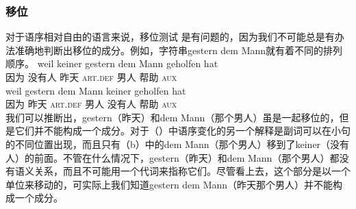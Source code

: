 \subsubsection{移位}
对于语序相对自由的语言来说，移位测试 是有问题的，因为我们不可能总是有办法准确地判断出移位的成分。例如，字符串gestern dem Mann就有着不同的排列顺序。
\eal
\ex 
\gll weil keiner gestern dem Mann geholfen hat\\
     因为 没有人 昨天 \textsc{art}.\textsc{def} 男人 帮助 \textsc{aux}\\
\ex 
\gll weil gestern dem Mann keiner geholfen hat\\
	 因为 昨天 \textsc{art}.\textsc{def} 男人 没有人 帮助 \textsc{aux}\\
\zl
我们可以推断出，gestern（昨天）和dem Mann（那个男人）虽是一起移位的，但是它们并不能构成一个成分。对于（）中语序变化的另一个解释是副词可以在小句的不同位置出现，而且只有（b）中的dem Mann（那个男人）移到了keiner（没有人）的前面。不管在什么情况下，gestern（昨天）和dem Mann（那个男人）都没有语义关系，而且不可能用一个代词来指称它们。尽管看上去，这个部分是以一个单位来移动的，可实际上我们知道gestern dem Mann（昨天那个男人）并不能构成一个成分。

